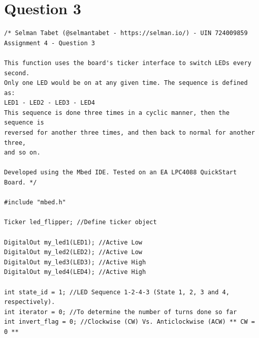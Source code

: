 \documentclass{article}
\begin{document}
\section*{Question 3}
\begin{verbatim}
/* Selman Tabet (@selmantabet - https://selman.io/) - UIN 724009859
Assignment 4 - Question 3

This function uses the board's ticker interface to switch LEDs every second.
Only one LED would be on at any given time. The sequence is defined as:
LED1 - LED2 - LED3 - LED4
This sequence is done three times in a cyclic manner, then the sequence is 
reversed for another three times, and then back to normal for another three,
and so on.

Developed using the Mbed IDE. Tested on an EA LPC4088 QuickStart Board. */

#include "mbed.h"

Ticker led_flipper; //Define ticker object

DigitalOut my_led1(LED1); //Active Low
DigitalOut my_led2(LED2); //Active Low
DigitalOut my_led3(LED3); //Active High
DigitalOut my_led4(LED4); //Active High

int state_id = 1; //LED Sequence 1-2-4-3 (State 1, 2, 3 and 4, respectively).
int iterator = 0; //To determine the number of turns done so far
int invert_flag = 0; //Clockwise (CW) Vs. Anticlockwise (ACW) ** CW = 0 **


\end{verbatim}
\end{document}
